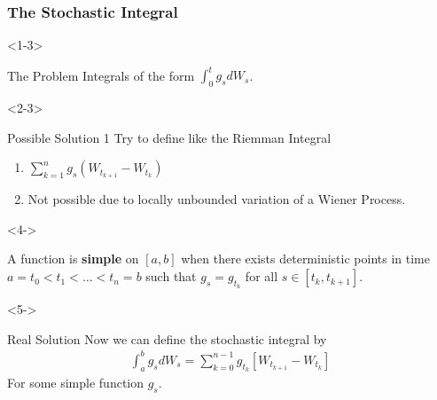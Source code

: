 \documentclass[10pt]{beamer}
\begin{document}
\begin{frame}[t]
  \frametitle{The Stochastic Integral}
  \begin{onlyenv}<1-3>
    \begin{block}{The Problem}
      Integrals of the form $\displaystyle\int_{0}^{t}g_s dW_s$.
    \end{block}
  \end{onlyenv}
  \begin{onlyenv}<2-3>
    \begin{block}{Possible Solution 1}
      Try to define like the Riemman Integral
      \begin{enumerate}
        \item<2-> $\displaystyle\sum_{k = 1}^{n}g_s(W_{t_{k+1}} - W_{t_{k}})$
        \item<3-> Not possible due to locally unbounded variation of a Wiener Process.
      \end{enumerate}
    \end{block}
  \end{onlyenv}
  \begin{onlyenv}<4->
    \begin{definition}
      A function is \textbf{simple} on $[a,b]$ when there exists deterministic points in time $a = t_0 < t_1 < \dots < t_n = b$ such that $g_s = g_{t_k}$ for all $s \in [t_k, t_{k+1}]$.
    \end{definition}
  \end{onlyenv}
  \begin{onlyenv}<5->
      \begin{block}{Real Solution}
        Now we can define the stochastic integral by
        \begin{align*}
          \displaystyle\int_{a}^{b}g_s dW_s = \displaystyle\sum_{k = 0}^{n - 1}g_{t_k}[W_{t_{k+1}} - W_{t_{k}}]
        \end{align*}
        For some simple function $g_s$.
      \end{block}
  \end{onlyenv}
\end{frame}
\end{document}
